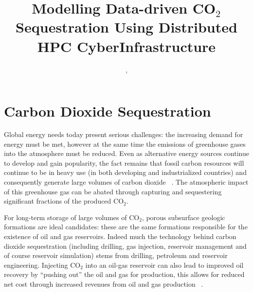 \documentclass[10pt,conference,final]{IEEEtran}
\begin{document}
\title{Modelling Data-driven CO$_{2}$ Sequestration Using Distributed HPC CyberInfrastructure}

 \author{,
    }


\maketitle

\begin{abstract}

\end{abstract}


\section*{Carbon Dioxide Sequestration}
Global energy needs today present serious challenges: the increasing demand for energy 
must be met, however at the same time the 
emissions of greenhouse gases into the atmosphere must be reduced. Even as alternative 
energy sources continue to develop and gain 
popularity, the fact remains that fossil carbon resources will continue to be in heavy use 
(in both developing and industrialized 
countries) and consequently generate large volumes of carbon dioxide ~\cite{GeoRPT}. The 
atmospheric impact of this greenhouse gas 
can be abated through capturing and sequestering significant fractions of the produced 
CO$_2$.

For long-term storage of large volumes of CO$_2$, porous subsurface geologic formations 
are ideal candidates: these are the same 
formations responsible for the existence of oil and gas reservoirs. Indeed much the 
technology behind carbon dioxide sequestration 
(including drilling, gas injection, reservoir management and of course reservoir 
simulation) stems from drilling, petroleum and 
reservoir engineering. Injecting CO$_2$ into an oil-gas reservoir can also lead to 
improved oil recovery by ``pushing out'' the 
oil and gas for production, this allows for reduced net cost through increased revenues 
from oil and gas production ~\cite{EORBook}.
\end{document}
